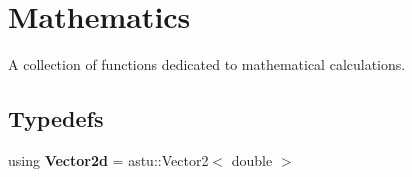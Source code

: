 \hypertarget{group__math__group}{}\section{Mathematics}
\label{group__math__group}


A collection of functions dedicated to mathematical calculations.  


\subsection*{Typedefs}
\begin{DoxyCompactItemize}
\item 
\mbox{\label{group__math__group_ga04b5b280f94e1b680b1c831c1df168bd}} 
using {\bfseries Vector2d} = astu\+::\+Vector2$<$ double $>$
\end{DoxyCompactItemize}
